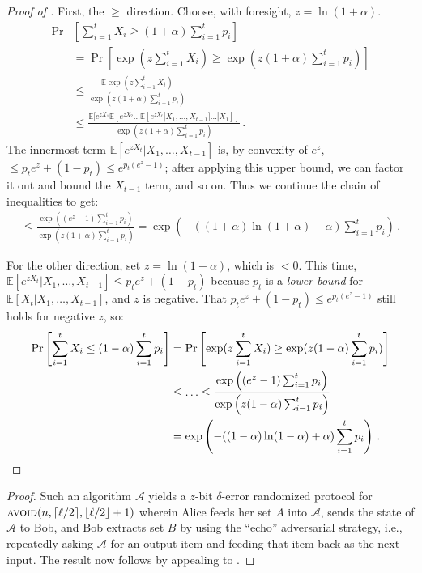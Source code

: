 \documentclass[10pt,a4paper]{article}
\theoremstyle{definition}
\theoremstyle{remark}
\newcommand{\EE}{\mathbb{E}}
\newcommand{\cA}{\mathcal{A}}
\newcommand{\ceil}[1]{{\left\lceil{#1}\right\rceil}}
\newcommand{\floor}[1]{{\left\lfloor{#1}\right\rfloor}}
\newcommand{\avoid}{\textsc{avoid}\xspace}
\newcommand{\rl}{\mathbf{\ell}}             %
\begin{document}
\begin{itemize}
\begin{itemize}
\begin{proof}[Proof of ]
  First, the $\ge$ direction. Choose, with foresight, $z = \ln(1 + \alpha)$.
  \begin{align*}
    \Pr&\left[ \sum_{i=1}^{t} X_i \ge (1 + \alpha) \sum_{i =1}^{t} p_i \right] \\
      &= \Pr\left[ \exp( z \sum_{i=1}^{t} X_i) \ge \exp(z (1 + \alpha) \sum_{i =1}^{t} p_i) \right] \\
      &\le \frac{\EE \exp( z \sum_{i=1}^{t} X_i)}{\exp(z (1 + \alpha) \sum_{i =1}^{t} p_i)} \\
      &\le \frac{\EE[e^{z X_1} \EE[e^{z X_2} \ldots \EE[e^{z X_t} | X_1,\ldots,X_{t-1}] \ldots | X_1] ]}{\exp(z (1 + \alpha) \sum_{i =1}^{t} p_i)} \,.
  \end{align*}
  The innermost term $\EE[e^{z X_t} | X_1,\ldots,X_{t-1}]$ is, by convexity of $e^z$, $\le p_t e^z + (1-p_t) \le e^{p_t (e^z - 1)}$; after applying this upper bound, we can factor it out and bound the $X_{t-1}$ term, and so on. Thus we continue the chain of inequalities to get:
  \begin{align*}
    \le \frac{\exp\left((e^z - 1)\sum_{i=1}^{t} p_i\right)}{\exp\left(z (1 + \alpha) \sum_{i =1}^{t} p_i\right)} = \exp\left(- ((1+\alpha) \ln (1+\alpha) - \alpha) \sum_{i =1}^{t} p_i\right) \,.
  \end{align*}
  
  For the other direction, set $z = \ln(1-\alpha)$, which is $< 0$.
  This time, $\EE[e^{z X_t} | X_1,\ldots,X_{t-1}] \le p_t e^z + (1-p_t)$ because $p_t$ is a \emph{lower bound} for $\EE[X_t | X_1,\ldots,X_{t-1}]$, and $z$ is negative. That $p_t e^z + (1-p_t) \le e^{p_t (e^z - 1)}$ still holds for negative $z$, so:
  \begin{align*}
    \Pr\left[ \sum_{i=1}^{t} X_i \le (1 - \alpha) \sum_{i =1}^{t} p_i \right] &= \Pr\left[ \exp(z\sum_{i=1}^{t} X_i) \ge \exp(z (1 - \alpha) \sum_{i =1}^{t} p_i) \right] \\
      &\le \ldots \le \frac{\exp\left((e^z - 1)\sum_{i=1}^{t} p_i\right)}{\exp\left(z (1 - \alpha) \sum_{i =1}^{t} p_i\right)} \\
      &= \exp\left(- ((1-\alpha) \ln (1-\alpha) + \alpha) \sum_{i =1}^{t} p_i\right) \,. \qedhere
  \end{align*}
\end{proof}

\begin{proof}
  Such an algorithm $\cA$ yields a $z$-bit $\delta$-error randomized protocol
  for $\avoid(n, \ceil{\rl/2}, \floor{\rl/2}+1)$ wherein Alice feeds her set
  $A$ into $\cA$, sends the state of $\cA$ to Bob, and Bob extracts set $B$ by
  using the ``echo'' adversarial strategy, i.e., repeatedly asking $\cA$ for
  an output item and feeding that item back as the next input. The result now
  follows by appealing to .
\end{proof}


\end{itemize}
\end{itemize}
\end{document}
